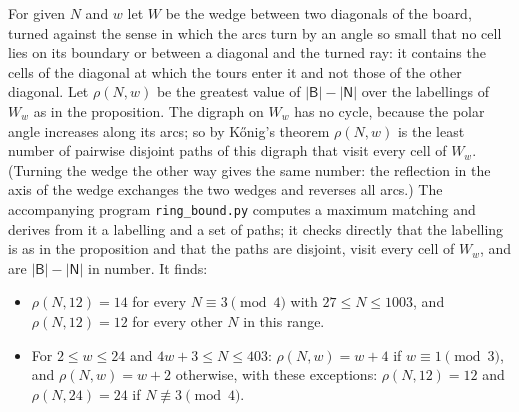 \documentclass[11pt]{amsart}
\theoremstyle{remark}
\begin{document}
For given $N$ and $w$ let $W$ be the wedge between two diagonals of the board, turned against the sense in which the
arcs turn by an angle so small that no cell lies on its boundary or between a diagonal and the turned ray: it
contains the cells of the diagonal at which the tours enter it and not those of the other diagonal. Let
$\rho(N,w)$ be the greatest value of $|\mathsf B|-|\mathsf N|$ over the labellings of $W_w$ as in the proposition.
The digraph on $W_w$ has no cycle, because the polar angle increases along its arcs; so by K\H onig's theorem
$\rho(N,w)$ is the least number of pairwise disjoint paths of this digraph that visit every cell of $W_w$. (Turning
the wedge the other way gives the same number: the reflection in the axis of the wedge exchanges the two wedges and
reverses all arcs.) The accompanying program \texttt{ring\_bound.py} computes a maximum matching and derives from it
a labelling and a set of paths; it checks directly that the labelling is as in the proposition and that the paths
are disjoint, visit every cell of $W_w$, and are $|\mathsf B|-|\mathsf N|$ in number. It finds:
\begin{itemize}
\item $\rho(N,12)=14$ for every $N\equiv3\pmod 4$ with $27\le N\le1003$, and $\rho(N,12)=12$ for every other $N$ in
this range.
\item For $2\le w\le24$ and $4w+3\le N\le403$: $\rho(N,w)=w+4$ if $w\equiv1\pmod 3$, and $\rho(N,w)=w+2$ otherwise,
with these exceptions: $\rho(N,12)=12$ and $\rho(N,24)=24$ if $N\not\equiv3\pmod 4$.
\end{itemize}
\end{document}
